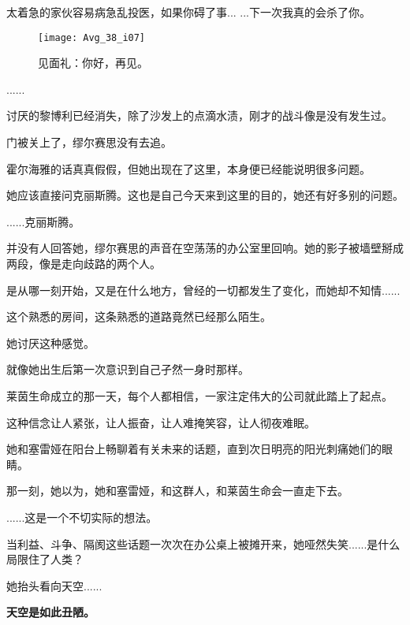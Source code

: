 \documentclass[openany]{book}
\begin{document}
\begin{dialogue}
     太着急的家伙容易病急乱投医，如果你碍了事...
     ...下一次我真的会杀了你。
\end{dialogue}

\begin{figure}[h]
    \caption*{见面礼：你好，再见。}
    \centering
    \texttt{[image: Avg\_38\_i07]}
\end{figure}

\begin{dialogue}
     ......
\end{dialogue}
\par
讨厌的黎博利已经消失，除了沙发上的点滴水渍，刚才的战斗像是没有发生过。\par
门被关上了，缪尔赛思没有去追。\par
霍尔海雅的话真真假假，但她出现在了这里，本身便已经能说明很多问题。\par
她应该直接问克丽斯腾。这也是自己今天来到这里的目的，她还有好多别的问题。\par
\begin{dialogue}
     ......克丽斯腾。
\end{dialogue}
\par
并没有人回答她，缪尔赛思的声音在空荡荡的办公室里回响。她的影子被墙壁掰成两段，像是走向歧路的两个人。\par
是从哪一刻开始，又是在什么地方，曾经的一切都发生了变化，而她却不知情......\par
这个熟悉的房间，这条熟悉的道路竟然已经那么陌生。\par
她讨厌这种感觉。\par
就像她出生后第一次意识到自己孑然一身时那样。\par
莱茵生命成立的那一天，每个人都相信，一家注定伟大的公司就此踏上了起点。\par
这种信念让人紧张，让人振奋，让人难掩笑容，让人彻夜难眠。\par
她和塞雷娅在阳台上畅聊着有关未来的话题，直到次日明亮的阳光刺痛她们的眼睛。\par
那一刻，她以为，她和塞雷娅，和这群人，和莱茵生命会一直走下去。\par
......这是一个不切实际的想法。\par
当利益、斗争、隔阂这些话题一次次在办公桌上被摊开来，她哑然失笑......是什么局限住了人类？\par
她抬头看向天空......\par
\begin{center} \textbf{天空是如此丑陋。}\end{center}
\end{document}
